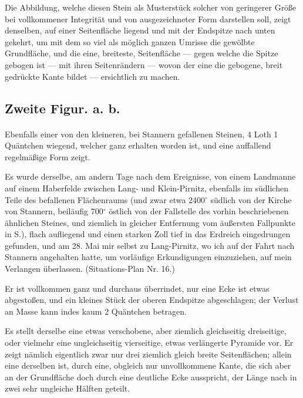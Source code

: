 \documentclass[a4paper, 11pt, oneside, german]{article}
\begin{document}
Die Abbildung, welche diesen Stein als Musterstück solcher von geringerer Größe bei vollkommener Integrität und von ausgezeichneter Form darstellen soll, zeigt denselben, auf einer Seitenfläche liegend und mit der Endspitze nach unten gekehrt, um mit dem so viel als möglich ganzen Umrisse die gewölbte Grundfläche, und die eine, breiteste, Seitenfläche --- gegen welche die Spitze gebogen ist --- mit ihren Seitenrändern --- wovon der eine die gebogene, breit gedrückte Kante bildet --- ersichtlich zu machen.

\subsection{Zweite Figur. a. b.}
\paragraph{}
Ebenfalls einer von den kleineren, bei Stannern gefallenen Steinen, 4 Loth 1 Quäntchen wiegend, welcher ganz erhalten worden ist, und eine auffallend regelmäßige Form zeigt.

Es wurde derselbe, am andern Tage nach dem Ereignisse, von einem Landmanne auf einem Haberfelde zwischen Lang- und Klein-Pirnitz, ebenfalls im südlichen Teile des befallenen Flächenraums (und zwar etwa 2400$^{\circ}$ südlich von der Kirche von Stannern, beiläufig 700$^{\circ}$ östlich von der Fallstelle des vorhin beschriebenen ähnlichen Steines, und ziemlich in gleicher Entfernung vom äußersten Fallpunkte in S.), flach aufliegend und einen starken Zoll tief in das Erdreich eingedrungen gefunden, und am 28. Mai mir selbst zu Lang-Pirnitz, wo ich auf der Fahrt nach Stannern angehalten hatte, um vorläufige Erkundigungen einzuziehen, auf mein Verlangen überlassen. (Situations-Plan Nr. 16.)

Er ist vollkommen ganz und durchaus überrindet, nur eine Ecke ist etwas abgestoßen, und ein kleines Stück der oberen Endspitze abgeschlagen; der Verlust an Masse kann indes kaum 2 Quäntchen betragen.

Es stellt derselbe eine etwas verschobene, aber ziemlich gleichseitig dreiseitige, oder vielmehr eine ungleichseitig vierseitige, etwas verlängerte Pyramide vor. Er zeigt nämlich eigentlich zwar nur drei ziemlich gleich breite Seitenflächen; allein eine derselben ist, durch eine, obgleich nur unvollkommene Kante, die sich aber an der Grundfläche doch durch eine deutliche Ecke ausspricht, der Länge nach in zwei sehr ungleiche Hälften geteilt.
\end{document}
